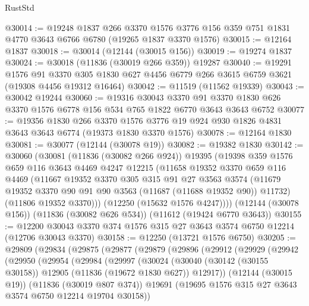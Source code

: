 \begin{lexlean}{RustStd}
\begin{coremodule}
@30014 := @19248
    @1837
    @266
    @3370
    @1576
    @3776
    @156
    @359
    @751
    @1831
    @4770
    @3643
    @6766
    @6780
    (@19265 @1837 @3370 @1576)
@30015 := @12164 @1837
@30018 := @30014 (@12144 (@30015 @156))
@30019 := @19274 @1837
@30024 := @30018 (@11836 (@30019 @266 @359)) @19287
@30040 := @19291
    @1576
    @91
    @3370
    @305
    @1830
    @627
    @4456
    @6779
    @266
    @3615
    @6759
    @3621
    (@19308 @4456 @19312 @16464)
@30042 := @11519 (@11562 @19339)
@30043 := @30042 @19244
@30060 := @19316
    @30043
    @3370
    @91
    @3370
    @1830
    @626
    @3370
    @1576
    @6778
    @156
    @534
    @765
    @1822
    @6770
    @3643
    @3643
    @6752
@30077 := @19356
    @1830
    @266
    @3370
    @1576
    @3776
    @19
    @924
    @930
    @1826
    @4831
    @3643
    @3643
    @6774
    (@19373 @1830 @3370 @1576)
@30078 := @12164 @1830
@30081 := @30077 (@12144 (@30078 @19))
@30082 := @19382 @1830
@30142 := @30060
    (@30081
      (@11836 (@30082 @266 @924))
      @19395
      (@19398
        @359
        @1576
        @659
        @116
        @3643
        @4469
        @4247
        @12215
        (@11658
          @19352
          @3370
          @659
          @116
          @4469
          (@11667
            @19352
            @3370
            @305
            @315
            @91
            @27
            @3563
            @3574
            (@11679 @19352 @3370 @90 @91 @90 @3563 (@11687 (@11688 @19352 @90)) @11732)
            (@11806 @19352 @3370)))
        (@12250 (@15632 @1576 @4247))))
    (@12144 (@30078 @156))
    (@11836 (@30082 @626 @534))
    (@11612 (@19424 @6770 @3643))
@30155 := @12200 @30043 @3370 @374 @1576 @315 @27 @3643 @3574 @6750 @12214 (@12706 @30043 @3370)
@30158 := @12250 (@13721 @1576 @6750)
@30205 := @29809
    (@29834
      (@29875
        (@29877
          (@29879
            (@29896
              (@29912
                (@29929
                  (@29942
                    (@29950
                      (@29954
                        (@29984
                          (@29997
                            (@30024
                              (@30040
                                (@30142 (@30155 @30158))
                                @12905
                                (@11836 (@19672 @1830 @627))
                                @12917))
                            (@12144 (@30015 @19))
                            (@11836 (@30019 @807 @374))
                            @19691
                            (@19695 @1576 @315 @27 @3643 @3574 @6750 @12214 @19704 @30158))

\end{coremodule}
\end{lexlean}
